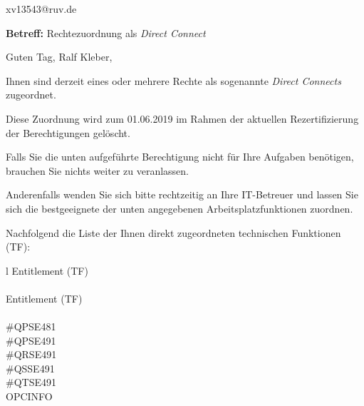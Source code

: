 \documentclass[a4paper,landscape,12pt]{letter}
\begin{document}
\begin{letter}{xv13543@ruv.de\hfill \break}
\begin{normalsize}
	\opening{\textbf{Betreff:} Rechtezuordnung als \emph{Direct Connect}}
	\begin{normalsize} \hfill
	\end{normalsize}

	\begin{normalsize}
		Guten Tag, 
	Ralf Kleber, \hfill \break
	\end{normalsize}
	\end{normalsize}
	
\begin{normalsize}
	Ihnen sind derzeit eines oder mehrere Rechte als sogenannte \emph{Direct Connects} zugeordnet.
	
	Diese Zuordnung wird zum 01.06.2019 im Rahmen der aktuellen Rezertifizierung der Berechtigungen gelöscht.
	
	Falls Sie die unten aufgeführte Berechtigung nicht für Ihre Aufgaben benötigen, 
	brauchen Sie nichts weiter zu veranlassen.
	
	Anderenfalls wenden Sie sich bitte rechtzeitig an Ihre IT-Betreuer 
	und lassen Sie sich die bestgeeignete der unten angegebenen Arbeitsplatzfunktionen zuordnen.
	\end{normalsize}
	
\begin{normalsize}
	Nachfolgend die Liste der Ihnen direkt zugeordneten technischen Funktionen (TF):

	\begin{longtable}{l}
		Entitlement (TF) \\ \hline
		\endfirsthead
		\\\hline
		Entitlement (TF) \\ \hline
		\endhead %
		\multicolumn{1}{r@{}}{Fortsetzung \ldots}\\
		\endfoot
		\hline
		\endlastfoot
	\#QPSE481\\\#QPSE491\\\#QRSE491\\\#QSSE491\\\#QTSE491\\OPCINFO\\
	\end{longtable}
	\end{normalsize}
	

\end{letter}
\end{document}
